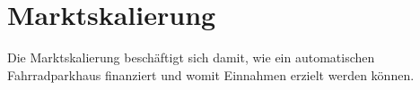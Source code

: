 \section{Marktskalierung}
\noindent Die Marktskalierung beschäftigt sich damit, wie ein automatischen Fahrradparkhaus finanziert und womit Einnahmen erzielt werden können.  
% 



\clearpage


\clearpage


\clearpage


\clearpage


% 

% 
